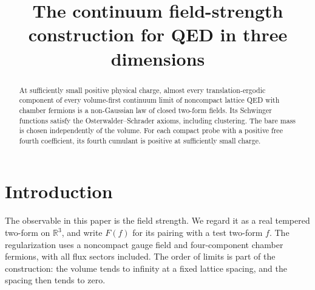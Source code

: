   \RequirePackage[backend=biber,style=alphabetic,backref=true,
    giveninits=true,isbn=false,date=year]{biblatex}
  
  \setcounter{biburlnumpenalty}{100}
  \setcounter{biburllcpenalty}{100}
  \setcounter{biburlucpenalty}{100}
  \renewcommand*{\bibfont}{\footnotesize}
\makeatother
\usepackage{mathrsfs}
\allowdisplaybreaks
\newcommand{\R}{\mathbb R}
\newcommand{\C}{\mathbb C}
\newcommand{\Z}{\mathbb Z}
\newcommand{\N}{\mathbb N}
\newcommand{\E}{\mathbb E}
\newcommand{\Sspace}{\mathcal S}
\newcommand{\cS}{\mathcal S}
\newcommand{\dd}{\mathrm d}
\DeclareMathOperator{\supp}{supp}
\DeclareMathOperator{\tr}{tr}
\DeclareMathOperator{\diag}{diag}

\newcommand{\extref}[2]{#1 of~\cite{#2}}
\newcommand{\exteq}[2]{(#1) of~\cite{#2}}
\title[The continuum field-strength construction for QED3]{The continuum field-strength construction for QED in three dimensions}
\date{}

\begin{abstract}
At sufficiently small positive physical charge, almost every translation-ergodic component of every volume-first continuum limit of noncompact lattice QED with chamber fermions is a non-Gaussian law of closed two-form fields. Its Schwinger functions satisfy the Osterwalder--Schrader axioms, including clustering. The bare mass is chosen independently of the volume. For each compact probe with a positive free fourth coefficient, its fourth cumulant is positive at sufficiently small charge.
\end{abstract}
\maketitle
\tableofcontents
\section{Introduction}

The observable in this paper is the field strength. We regard it as a real
tempered two-form on $\R^3$, and write $F(f)$ for its pairing with a test
two-form $f$. The regularization uses a noncompact gauge field and
four-component chamber fermions, with all flux sectors included.
The order of limits is part of the construction: the volume tends to
infinity at a fixed lattice spacing, and the spacing then tends to zero.

